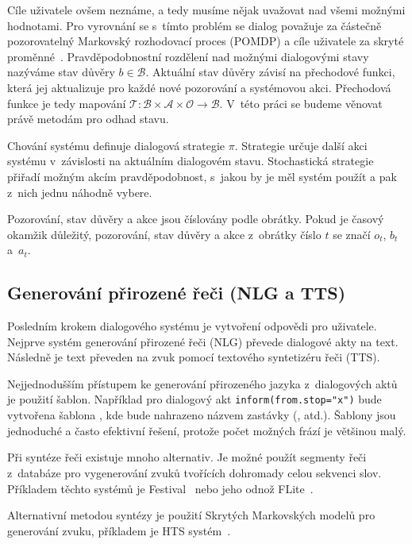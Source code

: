 Cíle uživatele ovšem neznáme, a tedy musíme nějak uvažovat nad všemi možnými hodnotami.
Pro vyrovnání se s~tímto problém se dialog považuje za částečně pozorovatelný Markovský rozhodovací proces (POMDP) a cíle uživatele za skryté proměnné~\cite{williams2007partially}.
Pravděpodobnostní rozdělení nad možnými dialogovými stavy nazýváme stav důvěry $b \in \mathcal{B}$.
Aktuální stav důvěry závisí na přechodové funkci, která jej aktualizuje pro každé nové pozorování a systémovou akci.
Přechodová funkce je tedy mapování $\mathcal{T} : \mathcal{B} \times \mathcal{A} \times \mathcal{O} \longrightarrow \mathcal{B}$.
V~této práci se budeme věnovat právě metodám pro odhad stavu.

Chování systému definuje dialogová strategie $\pi$.
Strategie určuje další akci systému v~závislosti na aktuálním dialogovém stavu.
Stochastická strategie přiřadí možným akcím pravděpodobnost, s~jakou by je měl systém použít a pak z~nich jednu náhodně vybere.

Pozorování, stav důvěry a akce jsou číslovány podle obrátky.
Pokud je časový okamžik důležitý, pozorování, stav důvěry a akce z~obrátky číslo $t$ se značí $o_t$, $b_t$ a~$a_t$.

\subsection{Generování přirozené řeči (NLG a TTS)}

Posledním krokem dialogového systému je vytvoření odpovědi pro uživatele.
Nejprve systém generování přirozené řeči (NLG) převede dialogové akty na text.
Následně je text převeden na zvuk pomocí textového syntetizéru řeči (TTS).

Nejjednodušším přístupem ke generování přirozeného jazyka z~dialogových aktů je použití šablon.
Například pro dialogový akt {\tt inform(from.stop="x")} bude vytvořena šablona , kde  bude nahrazeno názvem zastávky (,  atd.).
Šablony jsou jednoduché a často efektivní řešení, protože počet možných frází je většinou malý.

Při syntéze řeči existuje mnoho alternativ.
Je možné použít segmenty řeči z~databáze pro vygenerování zvuků tvořících dohromady celou sekvenci slov.
Příkladem těchto systémů je Festival~\cite{black2001festival} nebo jeho odnož  FLite~\cite{black2001flite}.

Alternativní metodou syntézy je použití Skrytých Markovských modelů pro generování zvuku, příkladem je HTS systém~\cite{zen2007hmm}.

